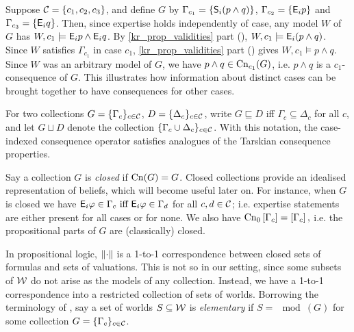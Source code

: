 \begin{example}
    Suppose $\C = \{c_1, c_2, c_3\}$, and define $G$ by $\Gamma_{c_1} = \{\S_i(p
    \land q)\}$, $\Gamma_{c_2} = \{\E_i{p}\}$ and $\Gamma_{c_3} = \{\E_i{q}\}$.
    Then, since expertise holds independently of case, any model $W$ of $G$ has
    $W, c_1 \models \E_i{p} \land \E_i{q}$. By \cref{kr_prop_validities} part
    (), $W, c_1 \models \E_i(p \land q)$.
    Since $W$ satisfies $\Gamma_{c_1}$ in case $c_1$, \cref{kr_prop_validities}
    part () gives $W, c_1 \models p \land
    q$. Since $W$ was an arbitrary model of $G$, we have $p \land q \in
    \cn_{c_1}(G)$, i.e. $p \land q$ is a $c_1$-consequence of $G$.
    This illustrates how information about distinct cases can be brought
    together to have consequences for other cases.

\end{example}

For two collections $G = \{\Gamma_c\}_{c \in \C}$, $D = \{\Delta_c\}_{c \in
\C}$, write $G \sqsubseteq D$ iff $\Gamma_c \subseteq \Delta_c$ for all $c$,
and let $G \sqcup D$ denote the collection $\{\Gamma_c \cup \Delta_c\}_{c \in
\C}$. With this notation, the case-indexed consequence operator satisfies
analogues of the Tarskian consequence properties.\footnotemark{}
%

Say a collection $G$ is \emph{closed} if $\cn(G) = G$. Closed collections
provide an idealised representation of beliefs, which will become useful later
on. For instance, when $G$ is closed we have
$
    \E_i\phi \in \Gamma_c \text{ iff } \E_i\phi \in \Gamma_d
$
for all $c, d \in \C$; i.e. expertise statements are either present for all
cases or for none. We also have
$
    \cnprop\proppart{\Gamma_c} = \proppart{\Gamma_c},
$
i.e. the propositional parts of $G$ are (classically) closed.

In propositional logic, $\propmods{\cdot}$ is a 1-to-1 correspondence between closed
sets of formulas and sets of valuations. This is not so in our setting, since
some subsets of $\W$ do not arise as the models of any collection. Instead, we
have a 1-to-1 correspondence into a restricted collection of sets of worlds.
%
Borrowing the terminology of
\textcite{delgrande2018general}, say a set of worlds $S \subseteq \W$ is
\emph{elementary} if ${S = \mod(G)}$ for some collection $G =
\{\Gamma_c\}_{c \in \C}$.\footnotemark{}


